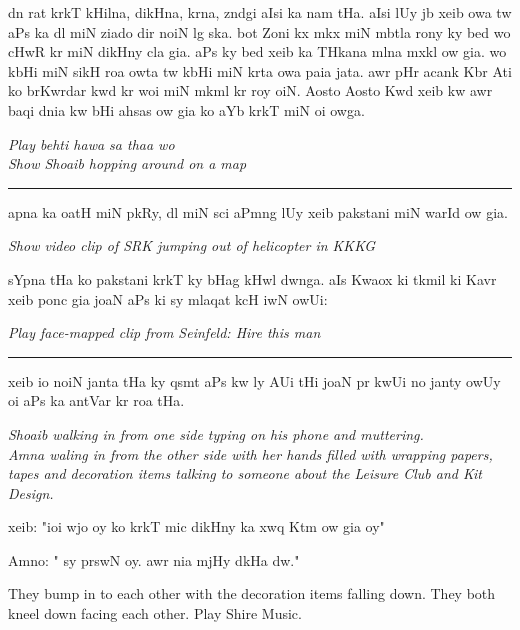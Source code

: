 \documentclass{article}
\begin{document}
	dn rat krkT kHilna, dikHna,  krna, zndgi aIsi ka nam tHa.
	aIsi lUy jb xeib  owa tw aPs ka dl  miN ziado dir noiN lg ska.
	bot Zoni kx mkx miN mbtla rony ky bed wo  cHwR kr  miN  dikHny cla gia.
	aPs ky bed xeib ka THkana mlna mxkl ow gia.
	wo kbHi  miN  sikH roa owta tw kbHi  miN  krta owa paia jata.
	awr pHr acank Kbr Ati ko brKwrdar  kwd kr woi  miN mkml kr roy oiN. 
	Aosto Aosto Kwd xeib kw awr baqi dnia kw bHi ahsas ow gia ko aYb  krkT miN oi owga.

\begin{enpara}
	\itshape
	Play behti hawa sa thaa wo\\
	Show Shoaib hopping around on a map
\end{enpara}

\rule{\textwidth}{1pt}

	apna  ka  oatH miN pkRy, dl miN sci aPmng lUy xeib pakstani miN warId ow gia.

\begin{enpara}
	\itshape
	Show video clip of SRK jumping out of helicopter in KKKG
\end{enpara}
\vspace{0.5\baselineskip}

	sYpna tHa ko pakstani krkT ky bHag kHwl dwnga.
	aIs Kwaox ki tkmil ki Kavr xeib  ponc gia joaN aPs ki  sy mlaqat kcH iwN owUi: 

\begin{enpara}
	\itshape
	Play face-mapped clip from Seinfeld: Hire this man
\end{enpara}



\rule{\textwidth}{1pt}

	xeib io noiN janta tHa ky qsmt aPs kw  ly AUi tHi joaN pr kwUi no janty owUy oi aPs ka antVar kr roa tHa.

\begin{enpara}
	\itshape
	Shoaib walking in from one side typing on his phone and muttering.\\
	Amna waling in from the other side with her hands filled with wrapping papers, tapes and decoration items talking to someone about the Leisure Club and Kit Design.
\end{enpara}

	xeib: "ioi wjo oy ko krkT mic dikHny ka xwq Ktm ow gia oy"
	
	\vspace{-0.5\baselineskip}
	Amno: " sy  prswN oy. awr nia  mjHy dkHa dw."

\begin{enpara}
	They bump in to each other with the decoration items falling down.
	They both kneel down facing each other.
	Play Shire Music.
\end{enpara}
\end{document}

